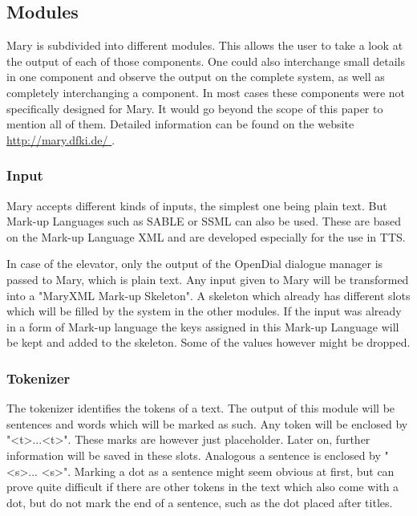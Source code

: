\documentclass[a4paper, 12pt]{article}
\begin{document}
\subsection{Modules}

Mary is subdivided into different modules.
This allows the user to take a look at the output of each of those components.
One could also interchange small details in one component and observe the output on the complete system, as well as completely interchanging a component.
In most cases these components were not specifically designed for Mary.
It would go beyond the scope of this paper to mention all of them.
Detailed information can be found on the website \url{http://mary.dfki.de/ }.

\subsubsection*{Input}

Mary accepts different kinds of inputs, the simplest one being plain text.
But Mark-up Languages such as SABLE or SSML can also be used.
These are based on the Mark-up Language XML and are developed especially for the use in TTS.

In case of the elevator, only the output of the OpenDial dialogue manager is passed to Mary, which is plain text.
Any input given to Mary will be transformed into a "MaryXML Mark-up Skeleton".
A skeleton which already has different slots which will be filled by the system in the other modules.
If the input was already in a form of Mark-up language the keys assigned in this Mark-up Language will be kept and added to the skeleton. Some of the values however might be dropped.

\subsubsection*{Tokenizer}

The tokenizer identifies the tokens of a text. The output of this module will be sentences and words which will be marked as such.
Any token will be enclosed by "\textless t\textgreater ...\textless  t\textgreater".
These marks are however just placeholder.
Later on, further information will be saved in these slots.
Analogous a sentence is enclosed by "\textless s\textgreater ... \textless s\textgreater".
Marking a dot as a sentence might seem obvious at first, but can prove quite difficult if there are other tokens in the text which also come with a dot, but do not mark the end of a sentence, such as the dot placed after titles.
\end{document}
